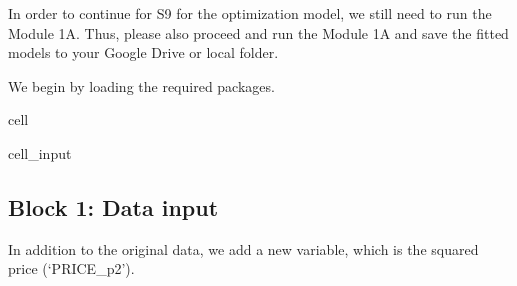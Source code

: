 \documentclass[letterpaper,10pt,english]{jupyterBook}
\begin{document}
\sphinxAtStartPar
In order to continue for S9 for the optimization model, we still need to run the Module 1A. Thus, please also proceed and run the Module 1A and save the fitted models to your Google Drive or local folder.

\sphinxAtStartPar
We begin by loading the required packages.

\begin{sphinxuseclass}{cell}\begin{sphinxVerbatimInput}

\begin{sphinxuseclass}{cell_input}
\begin{sphinxVerbatim}[commandchars=\\\{\}]
 
 
 
   

   
\end{sphinxVerbatim}

\end{sphinxuseclass}\end{sphinxVerbatimInput}

\end{sphinxuseclass}

\subsection{Block 1: Data input}
\label{\detokenize{docs/Case1_1_Simple_Retail_Demand_Model:block-1-data-input}}
\sphinxAtStartPar
In addition to the original data, we add a new variable, which is the squared price (‘PRICE\_p2’).
\end{document}
